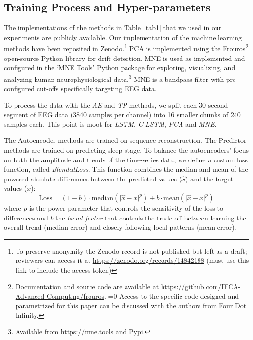 \documentclass[runningheads]{llncs}
\def\anon{0}
\begin{document}
\subsection{Training Process and Hyper-parameters}

The implementations of the methods in Table~\ref{tab1} that we used in
our experiments are publicly available. Our implementation of the
machine learning methods have been reposited in Zenodo.\footnote{To preserve
  anonymity the Zenodo record is not published but left as a draft;
  reviewers can access it at
  \href{https://zenodo.org/records/14842198?preview=1&token=eyJhbGciOiJIUzUxMiJ9.eyJpZCI6IjNjMWE3YTg3LTM4MzgtNGNlMC1hNDE4LTJjMWJlMjU5YjA3NyIsImRhdGEiOnt9LCJyYW5kb20iOiJiODVmNmVhMDE1NjczMThjNjI2MTI1ODQyZTExOWIxMiJ9.o4gCR2U_bkKruC97ZdexHkU7iVI2q28Cx_0tD8xkPjGyjoPdWNqsASLj62O0hhfdoFxliJFKKrQdrAWVoeLcXw}{https://zenodo.org/records/14842198} (must use this link to include the access token)}
PCA is implemented using the
Frouros\footnote{Documentation and source code are available at
  \url{https://github.com/IFCA-Advanced-Computing/frouros}.
\ifnum\anon=0
  Access to the specific code designed and parametrized for this
  paper can be discussed with the authors from Four Dot Infinity.
\fi
}
open-source Python library for drift detection.
MNE is used as implemented and configured in the `MNE Tools' Python
package for exploring, visualizing, and analyzing human
neurophysiological data.\footnote{Available from \url{https://mne.tools} and Pypi.}
MNE is a bandpass filter with pre-configured cut-offs specifically
targeting EEG data.

To process the data with the \emph{AE} and \emph{TP} methods, we split
each 30-second segment of EEG data (3840 samples per channel) into 16
smaller chunks of 240 samples each. This point is moot for \emph{LSTM},
\emph{C-LSTM}, \emph{PCA} and \emph{MNE}.

The Autoencoder methods are trained on sequence reconstruction. The
Predictor methods are trained on predicting sleep stage.
%
To balance the autoencoders' focus on both the amplitude and trends of the
time-series data, we define a custom loss function, called
\emph{BlendedLoss}. This function combines the median and mean of the
powered absolute differences between the predicted values ($\hat{x}$)
and the target values ($x$):
%
$$
\text{Loss} =
  (1 - b)\cdot\mathrm{median}(\lvert \hat{x} - x \rvert^p) +
  b\cdot\mathrm{mean}(\lvert \hat{x} - x \rvert^p)
$$
%
where $p$ is the power parameter that controls the sensitivity of the
loss to differences and $b$ the \emph{blend factor} that controls
the trade-off between learning the overall trend (median error) and
closely following local patterns (mean error).
\end{document}
